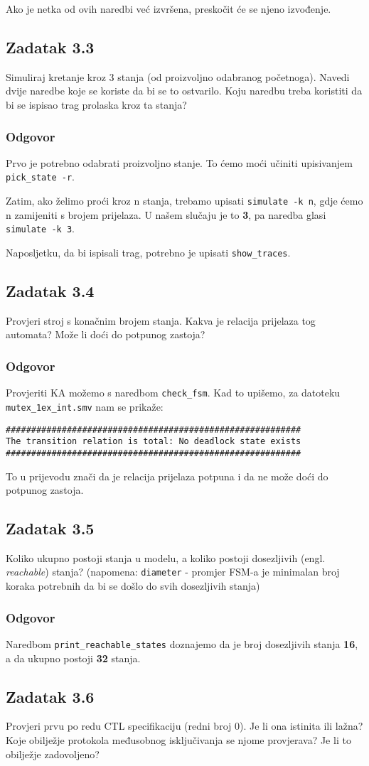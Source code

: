 \documentclass{article}
\newcommand{\code}[1]{\colorbox{blue!15}{\texttt{#1}}}
\newcommand{\odgovor}{\subsubsection*{Odgovor}}
\newcommand{\zadatak}[1]{\subsection{Zadatak #1}}
\begin{document}
\noindent
Ako je netka od ovih naredbi već izvršena, preskočit će se njeno izvođenje.
\pagebreak  %


\zadatak{3.3}

Simuliraj kretanje kroz 3 stanja (od proizvoljno odabranog početnoga). Navedi dvije naredbe koje se koriste da bi se to ostvarilo. Koju naredbu treba koristiti da bi se ispisao trag prolaska kroz ta stanja?

\odgovor

Prvo je potrebno odabrati proizvoljno stanje. To ćemo moći učiniti upisivanjem \code{pick\_state -r}.

Zatim, ako želimo proći kroz n stanja, trebamo upisati \code{simulate -k n}, gdje ćemo n zamijeniti s brojem prijelaza. U našem slučaju je to \textbf{3}, pa naredba glasi \code{simulate -k 3}.

Naposljetku, da bi ispisali trag, potrebno je upisati \code{show\_traces}.


\zadatak{3.4}

Provjeri stroj s konačnim brojem stanja. Kakva je relacija prijelaza tog automata? Može li doći do potpunog zastoja?

\odgovor

Provjeriti KA možemo s naredbom \code{check\_fsm}. Kad to upišemo, za datoteku \code{mutex\_1ex\_int.smv} nam se prikaže:

\begin{verbatim}
##########################################################
The transition relation is total: No deadlock state exists
##########################################################
\end{verbatim}

\noindent
To u prijevodu znači da je relacija prijelaza potpuna i da ne može doći do potpunog zastoja.


\zadatak{3.5}

Koliko ukupno postoji stanja u modelu, a koliko postoji dosezljivih (engl. \textit{reachable}) stanja? (napomena: \code{diameter} - promjer FSM-a je minimalan broj koraka potrebnih da bi se došlo do svih dosezljivih stanja)

\odgovor

Naredbom \code{print\_reachable\_states} doznajemo da je broj dosezljivih stanja \textbf{16}, a da ukupno postoji \textbf{32} stanja.
\pagebreak  %


\zadatak{3.6}

Provjeri prvu po redu CTL specifikaciju (redni broj 0). Je li ona istinita ili lažna? Koje obilježje protokola međusobnog isključivanja se njome provjerava? Je li to obilježje zadovoljeno?
\end{document}
